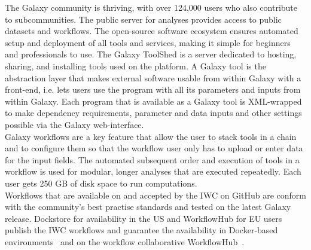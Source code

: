 The Galaxy community is thriving, with over 124,000 users who also contribute to subcommunities. The public server for analyses provides access to public datasets and workflows. The open-source software ecosystem ensures automated setup and deployment of all tools and services, making it simple for beginners and professionals to use. The Galaxy ToolShed is a server dedicated to hosting, sharing, and installing tools used on the platform. A Galaxy tool is the abstraction layer that makes external software usable from within Galaxy with a front-end, i.e. lets users use the program with all its parameters and inputs from within Galaxy. Each program that is available as a Galaxy tool is XML-wrapped to make dependency requirements, parameter and data inputs and other settings possible via the Galaxy web-interface. \\ 
Galaxy workflows are a key feature that allow the user to stack tools in a chain and to configure them so that the workflow user only has to upload or enter data for the input fields. The automated subsequent order and execution of tools in a workflow is used for modular, longer analyses that are executed repeatedly. Each user gets 250 GB of disk space to run computations. \\
Workflows that are available on and accepted by the \ac{IWC} on GitHub are conform with the community's best practise standards and tested on the latest Galaxy release. Dockstore for availability in the US and WorkflowHub for EU users  publish the \ac{IWC} workflows and guarantee the availability in Docker-based environments~\cite{o2017dockstore} and on the workflow collaborative WorkflowHub~\cite{goble2021implementing}.

